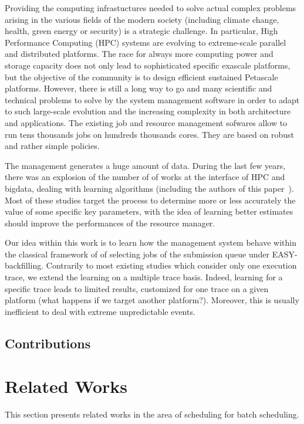 \documentclass[sigconf]{acmart}
\begin{document}
Providing the computing infrastuctures needed to solve actual complex problems
arising in the various fields of the modern society (including climate change,
health, green energy or security) is a strategic challenge.
In particular, High Performance Computing (HPC) systems are evolving to
extreme-scale parallel and distributed platforms.
The race for always more computing power and storage capacity does not only
lead to sophisticated specific exascale platforms, but the objective of the
community is to design efficient sustained Petascale platforms.
However, there is still a long way to go and many scientific and technical
problems to solve by the system management software in order to adapt to such
large-scale evolution and the increasing complexity
in both architecture and applications.
The existing job and resource management sofwares allow to run tens thousands
jobs on hundreds thousands cores.
They are based on robust and rather simple policies.

\bigskip
The management generates a huge amount of data.
During the last few years, there was an explosion of the number of of works at
the interface of HPC and bigdata, dealing with learning algorithms
(including the authors of this paper~\cite{learningruntimes}).
Most of these studies target the process to determine more or less accurately
the value of some specific key parameters, with the idea of
learning better estimates should improve the performances of the resource
manager.

\bigskip
Our idea within this work is to learn how the management system behave within
the classical framework of of selecting jobs of the submission queue under
EASY-backfilling.
Contrarily to most existing studies which consider only one execution trace, we
extend the learning on a multiple trace basis.
Indeed, learning for a specific trace leads to limited results, customized for
one trace on a given platform (what happens if we target another platform?).
Moreover, this is usually inefficient to deal with extreme unpredictable
events.

\subsection{Contributions}

\section{Related Works}
\label{sec:rw}

This section presents related works in the area of scheduling for batch scheduling.
\end{document}
